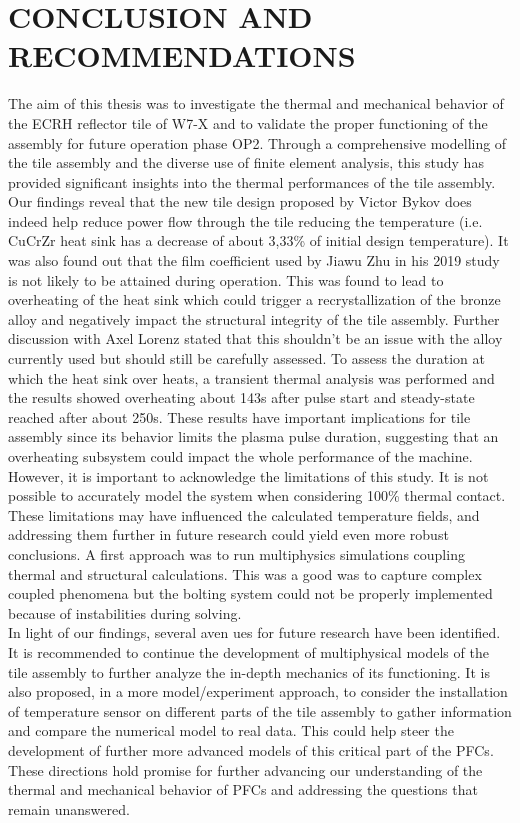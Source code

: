 \chapter{CONCLUSION AND RECOMMENDATIONS}
\normalsize{The aim of this thesis was to investigate the thermal and mechanical behavior of the \acrshort{ECRH} reflector tile of \acrshort{W7-X} and to validate the proper functioning of the assembly for future operation phase \acrshort{OP2}. Through a comprehensive modelling of the tile assembly and the diverse use of finite element analysis, this study has provided significant insights into the thermal performances of the tile assembly.}
\\
\break
\normalsize{\indent Our findings reveal that the new tile design proposed by Victor Bykov does indeed help reduce power flow through the tile reducing the temperature (i.e. \acrshort{CuCrZr} heat sink has a decrease of about 3,33\% of initial design temperature). It was also found out that the film coefficient used by Jiawu Zhu in his 2019 study is not likely to be attained during operation. This was found to lead to overheating of the heat sink which could trigger a recrystallization of the bronze alloy and negatively impact the structural integrity of the tile assembly. Further discussion with Axel Lorenz stated that this shouldn’t be an issue with the alloy currently used but should still be carefully assessed. To assess the duration at which the heat sink over heats, a transient thermal analysis was performed and the results showed overheating about 143s after pulse start and steady-state reached after about 250s. These results have important implications for tile assembly since its behavior limits the plasma pulse duration, suggesting that an overheating subsystem could impact the whole performance of the machine.}
\\
\break
\normalsize{\indent However, it is important to acknowledge the limitations of this study. It is not possible to accurately model the system when considering 100\% thermal contact. These limitations may have influenced the calculated temperature fields, and addressing them further in future research could yield even more robust conclusions. A first approach was to run multiphysics simulations coupling thermal and structural calculations. This was a good was to capture complex coupled phenomena but the bolting system could not be properly implemented because of instabilities during solving.}
\\
\break
\normalsize{\indent In light of our findings, several aven ues for future research have been identified. It is recommended to continue the development of multiphysical models of the tile assembly to further analyze the in-depth mechanics of its functioning. It is also proposed, in a more model/experiment approach, to consider the installation of temperature sensor on different parts of the tile assembly to gather information and compare the numerical model to real data. This could help steer the development of further more advanced models of this critical part of the \acrshort{PFCs}. These directions hold promise for further advancing our understanding of the thermal and mechanical behavior of \acrshort{PFCs} and addressing the questions that remain unanswered.}
